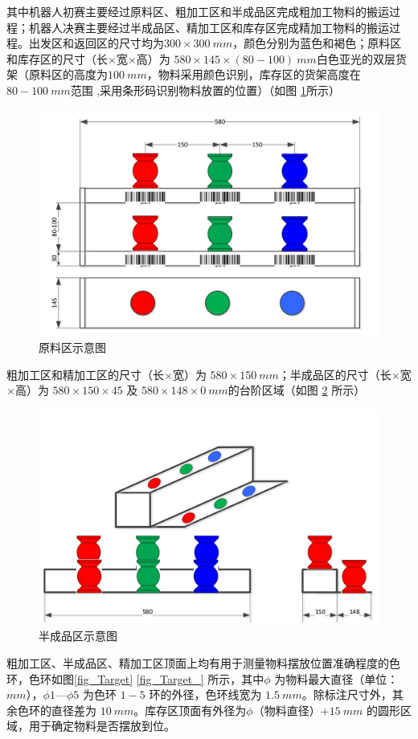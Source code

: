 \documentclass[a4paper,11pt,UTF8]{ctexart}
\begin{document}
其中机器人初赛主要经过原料区、粗加工区和半成品区完成粗加工物料的搬运过程；机器人决赛主要经过半成品区、精加工区和库存区完成精加工物料的搬运过程。出发区和返回区的尺寸均为$300\times300~mm$，颜色分别为蓝色和褐色；原料区和库存区的尺寸（长$\times$宽$\times$高）为 $580\times145\times(80-100)~mm$白色亚光的双层货架（原料区的高度为$100~mm$，物料采用颜色识别，库存区的货架高度在$80-100~mm$范围 ,采用条形码识别物料放置的位置）（如图 \ref{fig_Material_F}所示）
\begin{figure}[ht]
  \centering
  \includegraphics[width=12cm]{原料区.jpg}
  \caption{原料区示意图} \label{fig_Material_F}
\end{figure}
粗加工区和精加工区的尺寸（长$\times$宽）为 $580\times150~mm$；半成品区的尺寸（长$\times$宽$\times$高）为 $580\times150\times45$ 及 $580\times148\times0~mm$的台阶区域（如图 \ref{fig_Half} 所示）
\begin{figure}[htbp]
  \centering
  \includegraphics[width=12cm]{半成品区.jpg}
  \caption{半成品区示意图} \label{fig_Half}
\end{figure}
粗加工区、半成品区、精加工区顶面上均有用于测量物料摆放位置准确程度的色环，色环如图\ref{fig_Target} \ref{fig_Target_} 所示，其中$\phi$ 为物料最大直径（单位：$mm$），$\phi 1 — \phi 5$ 为色环 $1-5$ 环的外径，色环线宽为 $1.5~mm$。除标注尺寸外，其余色环的直径差为 $10~mm$。库存区顶面有外径为$\phi$（物料直径）$+15~mm$ 的圆形区域，用于确定物料是否摆放到位。
\end{document}
